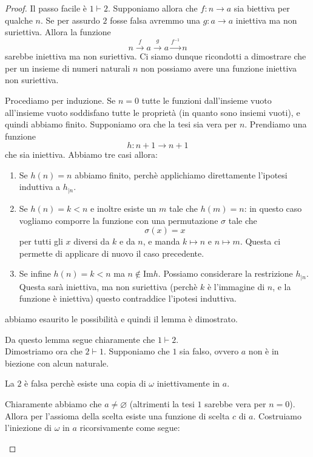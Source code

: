 \documentclass[11pt]{scrartcl}
\newcommand{\eset}{\varnothing}
\begin{document}
 	\begin{proof}
 		Il passo facile è $1\vdash 2$. Supponiamo allora che $f:n\to a$ sia biettiva per qualche $n$. Se per assurdo $2$ fosse falsa avremmo una $g:a\to a$ iniettiva ma non suriettiva. Allora la funzione
 		$$n\overset{f}{\to}a\overset{g}{\to}a\overset{f^{-1}}{\to}n$$
 		sarebbe iniettiva ma non suriettiva. Ci siamo dunque ricondotti a dimostrare che per un insieme di numeri naturali $n$ non possiamo avere una funzione iniettiva non suriettiva.
 		\begin{subproof}[Lemma]
 			Procediamo per induzione. Se $n=0$ tutte le funzioni dall'insieme vuoto all'insieme vuoto soddisfano tutte le proprietà (in quanto sono insiemi vuoti), e quindi abbiamo finito. Supponiamo ora che la tesi sia vera per $n$. Prendiamo una funzione 
 			$$h:n+1\to n+1$$
 			che sia iniettiva. Abbiamo tre casi allora:
 			\begin{enumerate}
 				\item Se $h(n)=n$ abbiamo finito, perchè applichiamo direttamente l'ipotesi induttiva a $h_{\mid n}$.
 				\item Se $h(n)=k <n$ e inoltre esiste un $m$ tale che $h(m)=n$: in questo caso vogliamo comporre la funzione con una permutazione $\sigma$ tale che
 				$$\sigma(x)=x$$
 				per tutti gli $x$ diversi da $k$ e da $n$, e manda $k\mapsto n$ e $n\mapsto m$. Questa ci permette di applicare di nuovo il caso precedente.
 				\item Se infine $h(n)=k<n $ ma $n\not\in \text{Im}h$. Possiamo considerare la restrizione $h_{\mid n}$. Questa sarà iniettiva, ma non suriettiva (perchè $k$ è l'immagine di $n$, e la funzione è iniettiva) questo contraddice l'ipotesi induttiva. 
 			\end{enumerate} 
 			abbiamo esaurito le possibilità e quindi il lemma è dimostrato.
 		\end{subproof}
 		Da questo lemma segue chiaramente che $1\vdash 2$. \\
 		Dimostriamo ora che $2\vdash 1$. Supponiamo che $1$ sia falso, ovvero $a$ non è in biezione con alcun naturale.
 		\begin{claim}
 			La $2$ è falsa perchè esiste una copia di $\omega$ iniettivamente in $a$.
 		\end{claim}
 		\begin{subproof}[Dimostrazione]
 			Chiaramente abbiamo che $a\ne \eset$ (altrimenti la tesi $1$ sarebbe vera per $n=0$). Allora per l'assioma della scelta esiste una funzione di scelta $c$ di $a$. Costruiamo l'iniezione di $\omega$ in $a$ ricorsivamente come segue:

\end{subproof}
\end{proof}
\end{document}
